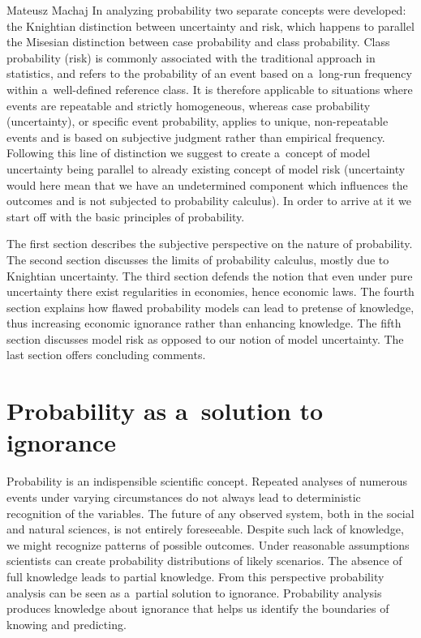 \begin{artengenv}{Mateusz Machaj}
In analyzing probability two separate concepts were developed: the Knightian distinction between uncertainty and risk, which happens to parallel the Misesian distinction between case probability and class probability. Class probability (risk) is commonly associated with the traditional approach in statistics, and refers to the probability of an event based on a~long-run frequency within a~well-defined reference class. It is therefore applicable to situations where events are repeatable and strictly homogeneous, whereas case probability (uncertainty), or specific event probability, applies to unique, non-repeatable events and is based on subjective judgment rather than empirical frequency. Following this line of distinction we suggest to create a~concept of model uncertainty being parallel to already existing concept of model risk (uncertainty would here mean that we have an undetermined component which influences the outcomes and is not subjected to probability calculus). In order to arrive at it we start off with the basic principles of probability.



The first section describes the subjective perspective on the nature of probability. The second section discusses the limits of probability calculus, mostly due to Knightian uncertainty. The third section defends the notion that even under pure uncertainty there exist regularities in economies, hence economic laws. The fourth section explains how flawed probability models can lead to pretense of knowledge, thus increasing economic ignorance rather than enhancing knowledge. The fifth section discusses model risk as opposed to our notion of model uncertainty. The last section offers concluding comments.



\section{Probability as a~solution to ignorance}

Probability is an indispensible scientific concept. Repeated analyses of numerous events under varying circumstances do not always lead to deterministic recognition of the variables. The future of any observed system, both in the social and natural sciences, is not entirely foreseeable. Despite such lack of knowledge, we might recognize patterns of possible outcomes. Under reasonable assumptions scientists can create probability distributions of likely scenarios. The absence of full knowledge leads to partial knowledge. From this perspective probability analysis can be seen as a~partial solution to ignorance. Probability analysis produces knowledge about ignorance that helps us identify the boundaries of knowing and predicting.




\end{artengenv}
